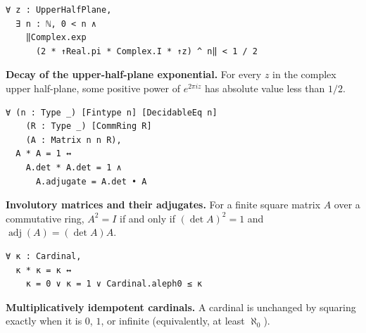 \begin{list}{}
\item
\begin{samepage}
\begin{lstlisting}[basicstyle=\ttfamily\footnotesize,frame=single,breaklines=true]
∀ z : UpperHalfPlane,
  ∃ n : ℕ, 0 < n ∧
    ‖Complex.exp
      (2 * ↑Real.pi * Complex.I * ↑z) ^ n‖ < 1 / 2
\end{lstlisting}
\noindent\textbf{Decay of the upper-half-plane exponential.}
For every $z$ in the complex upper half-plane, some positive power of
$e^{2\pi i z}$ has absolute value less than $1/2$. 
\end{samepage}

\item
\begin{samepage}
\begin{lstlisting}[basicstyle=\ttfamily\footnotesize,frame=single,breaklines=true]
∀ (n : Type _) [Fintype n] [DecidableEq n]
    (R : Type _) [CommRing R]
    (A : Matrix n n R),
  A * A = 1 ↔
    A.det * A.det = 1 ∧
      A.adjugate = A.det • A
\end{lstlisting}
\noindent\textbf{Involutory matrices and their adjugates.}
For a finite square matrix $A$ over a commutative ring, $A^2=I$ if and only if
$(\det A)^2=1$ and $\operatorname{adj}(A)=(\det A)A$.
\end{samepage}

\item
\begin{samepage}
\begin{lstlisting}[basicstyle=\ttfamily\footnotesize,frame=single,breaklines=true]
∀ κ : Cardinal,
  κ * κ = κ ↔
    κ = 0 ∨ κ = 1 ∨ Cardinal.aleph0 ≤ κ
\end{lstlisting}
\noindent\textbf{Multiplicatively idempotent cardinals.}
A cardinal is unchanged by squaring exactly when it is $0$, $1$, or infinite
(equivalently, at least $\aleph_0$).
\end{samepage}


\end{list}
